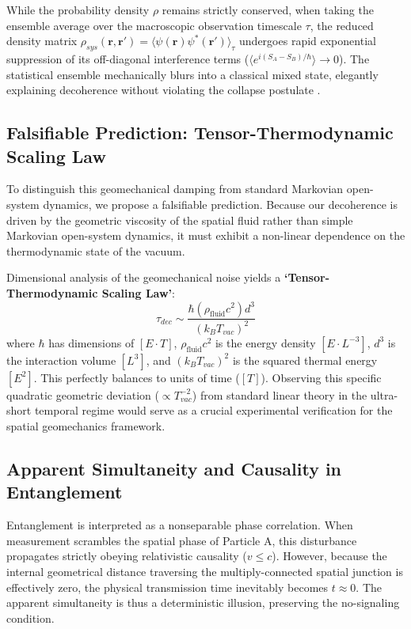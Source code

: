 \documentclass[reprint,amsmath,amssymb,aps,prd]{revtex4-2}
\begin{document}
While the probability density $\rho$ remains strictly conserved, when taking the ensemble average over the macroscopic observation timescale $\tau$, the reduced density matrix $\rho_{sys}(\mathbf{r}, \mathbf{r}') = \langle \psi(\mathbf{r})\psi^*(\mathbf{r}') \rangle_{\tau}$ undergoes rapid exponential suppression of its off-diagonal interference terms ($\langle e^{i(S_A - S_B)/\hbar} \rangle \to 0$). The statistical ensemble mechanically blurs into a classical mixed state, elegantly explaining decoherence without violating the collapse postulate \cite{Zurek2003}.

\subsection{Falsifiable Prediction: Tensor-Thermodynamic Scaling Law}
To distinguish this geomechanical damping from standard Markovian open-system dynamics, we propose a falsifiable prediction. Because our decoherence is driven by the geometric viscosity of the spatial fluid rather than simple Markovian open-system dynamics, it must exhibit a non-linear dependence on the thermodynamic state of the vacuum.

Dimensional analysis of the geomechanical noise yields a \textbf{`Tensor-Thermodynamic Scaling Law'}:
\begin{equation}
\tau_{dec} \sim \frac{\hbar (\rho_{\mathrm{fluid}} c^2) d^3}{(k_B T_{vac})^2}
\end{equation}
where $\hbar$ has dimensions of $[E \cdot T]$, $\rho_{\mathrm{fluid}} c^2$ is the energy density $[E \cdot L^{-3}]$, $d^3$ is the interaction volume $[L^3]$, and $(k_B T_{vac})^2$ is the squared thermal energy $[E^2]$. This perfectly balances to units of time ($[T]$). Observing this specific quadratic geometric deviation ($\propto T_{vac}^{-2}$) from standard linear theory in the ultra-short temporal regime would serve as a crucial experimental verification for the spatial geomechanics framework.

\subsection{Apparent Simultaneity and Causality in Entanglement}
Entanglement is interpreted as a nonseparable phase correlation. When measurement scrambles the spatial phase of Particle A, this disturbance propagates strictly obeying relativistic causality ($v \le c$). However, because the internal geometrical distance traversing the multiply-connected spatial junction is effectively zero, the physical transmission time inevitably becomes $t \approx 0$. The apparent simultaneity is thus a deterministic illusion, preserving the no-signaling condition.
\end{document}
